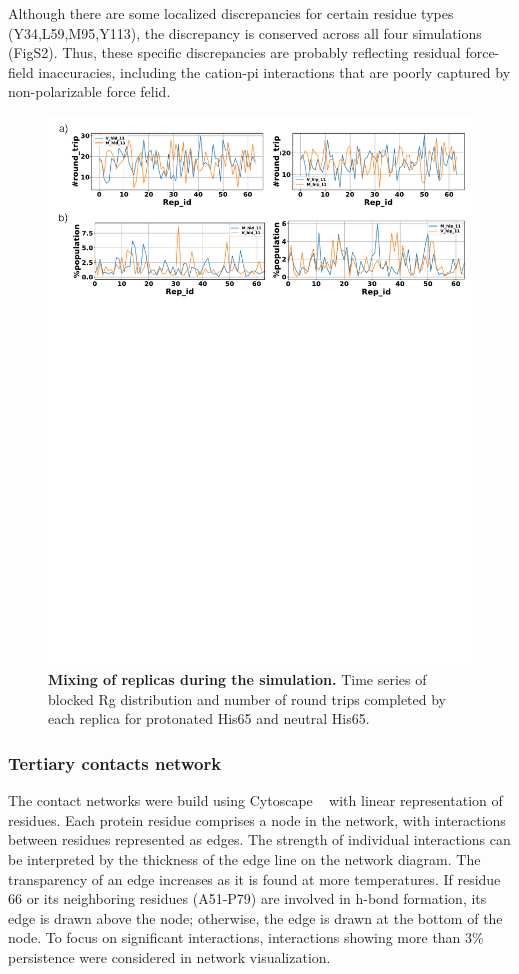 \documentclass[journal=jacsat,manuscript=article]{achemso}
\begin{document}
Although there are some localized discrepancies for certain residue types (Y34,L59,M95,Y113), the discrepancy is conserved across all four simulations (FigS2). Thus, these specific discrepancies are probably reflecting residual force-field inaccuracies, including the cation-pi interactions that are poorly captured by non-polarizable force felid.

\begin{figure}[!ht]
 \includegraphics[scale=0.5,width=\textwidth,trim={0 0cm 0 0},clip]{../figures/S13.pdf}
\caption{{\bf Mixing of replicas during the simulation.}
Time series of blocked Rg distribution and number of round trips completed by each replica for protonated His65 and neutral His65.
 }
\label{S13} 
\end{figure}


\subsubsection*{Tertiary contacts network} The contact networks were build using Cytoscape ~\cite {Ahlstrom2013} with linear representation of residues.  Each protein residue comprises a node in the network, with interactions between residues represented as edges. The strength of individual interactions can be interpreted by the  thickness of the edge line on the network diagram. The transparency of an edge increases as it is found at more temperatures.  If residue  66 or its neighboring residues (A51-P79) are involved in h-bond formation, its edge is drawn above the node; otherwise, the edge is drawn at the bottom of the node. To focus on significant interactions, interactions showing more than 3\% persistence were considered in network visualization.      
\end{document}
